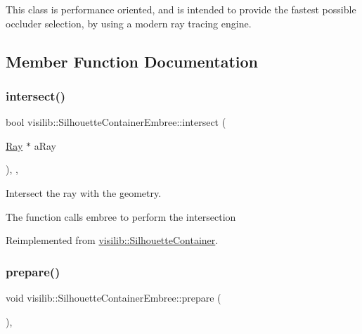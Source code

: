 This class is performance oriented, and is intended to provide the fastest possible occluder selection, by using a modern ray tracing engine. 

\subsection{Member Function Documentation}
\mbox{\label{classvisilib_1_1_silhouette_container_embree_a3a7290096b31163d775b11a356b7d3e0}} 
\subsubsection{\texorpdfstring{intersect()}{intersect()}}
{\footnotesize\ttfamily bool visilib\+::\+Silhouette\+Container\+Embree\+::intersect (\begin{DoxyParamCaption}\item[{\mbox{\hyperlink{structvisilib_1_1_ray}{Ray}} $\ast$}]{a\+Ray }\end{DoxyParamCaption})\hspace{0.3cm}{\ttfamily [inline]}, {\ttfamily [override]}, {\ttfamily [virtual]}}



Intersect the ray with the geometry. 

The function calls embree to perform the intersection 

Reimplemented from \mbox{\hyperlink{classvisilib_1_1_silhouette_container}{visilib\+::\+Silhouette\+Container}}.

\mbox{\label{classvisilib_1_1_silhouette_container_embree_ad3d6193f5484b3fb56096efd8a1230a8}} 
\subsubsection{\texorpdfstring{prepare()}{prepare()}}
{\footnotesize\ttfamily void visilib\+::\+Silhouette\+Container\+Embree\+::prepare (\begin{DoxyParamCaption}{ }\end{DoxyParamCaption})\hspace{0.3cm}{\ttfamily [inline]}, {\ttfamily [virtual]}}



